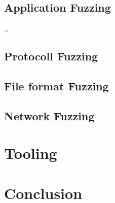 \documentclass[journal=tosc,final]{iacrtrans}
\begin{document}
\subsection{Application Fuzzing}
\dots
\subsection{Protocoll Fuzzing}
\subsection{File format Fuzzing}
\subsection{Network Fuzzing}
\section{Tooling}
\section{Conclusion}





\end{document}
